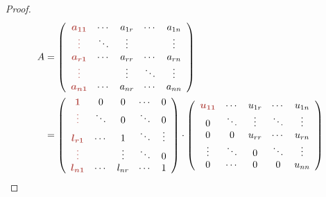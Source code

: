 \begin{proof}
    \begin{equation}\displaystyle \begin{aligned} A & =\left(\begin{array}{ c c c c c }
                \boldsymbol{\textcolor[rgb]{0.72,0.33,0.31}{a_{11}}}  & \cdots & a_{1r} & \cdots & a_{1n} \\
                \boldsymbol{\textcolor[rgb]{0.72,0.33,0.31}{\vdots }} & \ddots & \vdots &        & \vdots \\
                \boldsymbol{\textcolor[rgb]{0.72,0.33,0.31}{a_{r1}}}  & \cdots & a_{rr} & \cdots & a_{rn} \\
                \boldsymbol{\textcolor[rgb]{0.72,0.33,0.31}{\vdots }} &        & \vdots & \ddots & \vdots \\
                \boldsymbol{\textcolor[rgb]{0.72,0.33,0.31}{a_{n1}}}  & \cdots & a_{nr} & \cdots & a_{nn}
            \end{array}\right)                                               \\
                  & =\left(\begin{array}{ c c c c c }
                \boldsymbol{\textcolor[rgb]{0.72,0.33,0.31}{1}}       & 0      & 0      & \cdots & 0      \\
                \boldsymbol{\textcolor[rgb]{0.72,0.33,0.31}{\vdots }} & \ddots & 0      & \ddots & 0      \\
                \boldsymbol{\textcolor[rgb]{0.72,0.33,0.31}{l_{r1}}}  & \cdots & 1      & \ddots & \vdots \\
                \boldsymbol{\textcolor[rgb]{0.72,0.33,0.31}{\vdots }} &        & \vdots & \ddots & 0      \\
                \boldsymbol{\textcolor[rgb]{0.72,0.33,0.31}{l_{n1}}}  & \cdots & l_{nr} & \cdots & 1
            \end{array}\right) \cdot \left(\begin{array}{ c c c c c }
                \boldsymbol{\textcolor[rgb]{0.72,0.33,0.31}{u_{11}}} & \cdots & u_{1r} & \cdots & u_{1n} \\
                0                                                    & \ddots & \vdots & \ddots & \vdots \\
                0                                                    & 0      & u_{rr} & \cdots & u_{rn} \\
                \vdots                                               & \ddots & 0      & \ddots & \vdots \\
                0                                                    & \cdots & 0      & 0      & u_{nn}
            \end{array}\right)
        \end{aligned}\end{equation}
\end{proof}

